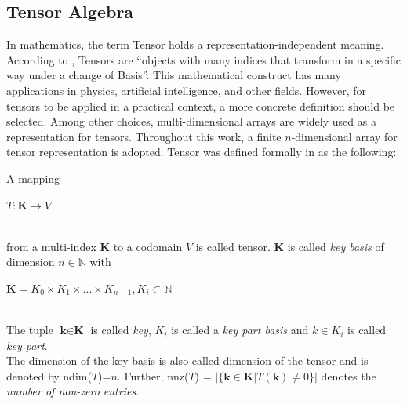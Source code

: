 \subsection{Tensor Algebra}
\label{sec:tensor_algebra}
In mathematics, the term Tensor holds a representation-independent meaning. According to \cite{kj}, Tensors are “objects with many indices that transform in a specific way under a change of
Basis”. This mathematical construct has many applications in physics, artificial intelligence, and other fields. However, for tensors to be applied in a practical context, a more concrete definition should be selected. Among other choices, multi-dimensional arrays are widely used as a representation for tensors. Throughout this work, a finite $n$-dimensional array for tensor representation is adopted.
Tensor was defined formally in \cite{tentris2020} as the following:

\begin{definition}[Tensor]
A mapping\\
\centerline{$T: \textbf{K} \to V$}\\
from a multi-index $\textbf{K}$ to a codomain $V$ is called tensor. $\textbf{K}$ is called \textit{key basis} of dimension $n \in \mathbb{N}$ with \\
\centerline{ $\textbf{K} = K_0 \times K_1 \times ... \times K_{n-1}, K_i \subset \mathbb{N}$ } \\
The tuple $\textbf{k} \in \textbf{K}$ is called \textit{key}, $K_i$ is called a \textit{key part basis} and $k \in K_i$ is called \textit{key part}.\\
The dimension of the key basis is also called dimension of the tensor and is denoted by ndim($T$)=$n$. Further, nnz($T$) = $|\{\textbf{k} \in \textbf{K} | T(\textbf{k})  \neq 0\}|$ denotes the \textit{ number of non-zero entries}.
\end{definition} 

